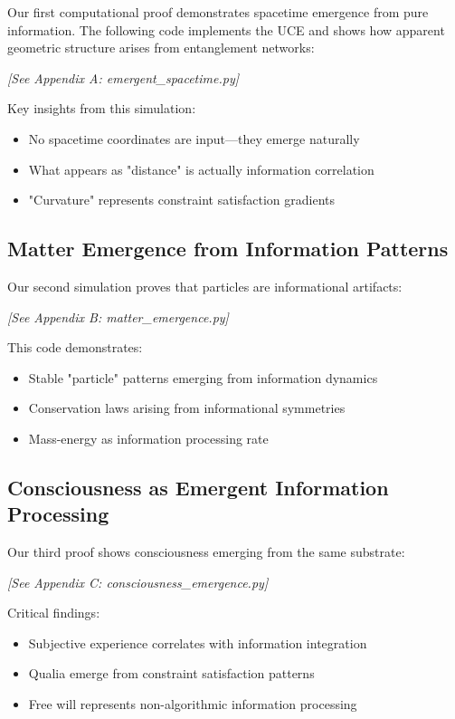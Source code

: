 \documentclass[12pt]{article}
\begin{document}
Our first computational proof demonstrates spacetime emergence from pure information. The following code implements the UCE and shows how apparent geometric structure arises from entanglement networks:

\textit{[See Appendix A: emergent\_spacetime.py]}

Key insights from this simulation:
\begin{itemize}
\item No spacetime coordinates are input—they emerge naturally
\item What appears as "distance" is actually information correlation
\item "Curvature" represents constraint satisfaction gradients
\end{itemize}

\subsection{Matter Emergence from Information Patterns}

Our second simulation proves that particles are informational artifacts:

\textit{[See Appendix B: matter\_emergence.py]}

This code demonstrates:
\begin{itemize}
\item Stable "particle" patterns emerging from information dynamics
\item Conservation laws arising from informational symmetries
\item Mass-energy as information processing rate
\end{itemize}

\subsection{Consciousness as Emergent Information Processing}

Our third proof shows consciousness emerging from the same substrate:

\textit{[See Appendix C: consciousness\_emergence.py]}

Critical findings:
\begin{itemize}
\item Subjective experience correlates with information integration
\item Qualia emerge from constraint satisfaction patterns
\item Free will represents non-algorithmic information processing
\end{itemize}
\end{document}
